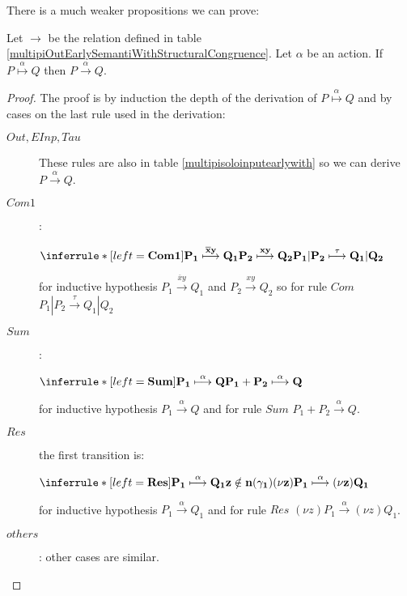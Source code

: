 There is a much weaker propositions we can prove:
\begin{proposition}
  Let $\rightarrow$ be the relation defined in table \ref{multipiOutEarlySemantiWithStructuralCongruence}. Let $\alpha$ be an action. If $P \stackrel{\alpha}{\longmapsto} Q$ then $P\xrightarrow{\alpha} Q$.
  \begin{proof}
    The proof is by induction the depth of the derivation of $P \stackrel{\alpha}{\longmapsto} Q$ and by cases on the last rule used in the derivation:
    \begin{description}
      \item[$Out, EInp, Tau$]
	These rules are also in table \ref{multipisoloinputearlywith} so we can derive $P\xrightarrow{\alpha} Q$. 
      \item[$Com1$]:
	\begin{center}
	  $\inferrule* [left=\bf{Com1}]{
	    P_{1} \stackrel{\overline{x}y}{\longmapsto} Q_{1}
	  \\
	    P_{2} \stackrel{xy}{\longmapsto} Q_{2}
	  }{
	    P_{1}|P_{2} \stackrel{\tau}{\longmapsto} Q_{1}|Q_{2}
	  }$ 
	\end{center}
	for inductive hypothesis $P_{1} \xrightarrow{\overline{x}y} Q_{1}$ and $P_{2} \xrightarrow{xy} Q_{2}$ so for rule $Com$ $P_{1}|P_{2} \xrightarrow{\tau} Q_{1}|Q_{2}$
      \item[$Sum$]:
	\begin{center}
	  $\inferrule* [left=\bf{Sum}]{
	    P_{1} \stackrel{\alpha}{\longmapsto} Q
	  }{
	    P_{1}+P_{2} \stackrel{\alpha}{\longmapsto} Q
	  }$ 
	\end{center}
	for inductive hypothesis $P_{1} \xrightarrow{\alpha} Q$ and for rule $Sum$ $P_{1}+P_{2} \xrightarrow{\alpha} Q$.
      \item[$Res$] the first transition is:
	\begin{center}
	  $\inferrule* [left=\bf{Res}]{
	      P_{1} \stackrel{\alpha}{\longmapsto} Q_{1}
	    \\
	      z\notin n(\gamma_{1})
	  }{
	    (\nu z) P_{1} \stackrel{\alpha}{\longmapsto} (\nu z)Q_{1}
	  }$ 
	\end{center}		
	for inductive hypothesis $P_{1} \xrightarrow{\alpha} Q_{1}$ and for rule $Res$ $(\nu z)P_{1} \xrightarrow{\alpha} (\nu z)Q_{1}$.
      \item[$others$]: other cases are similar.
    \end{description}	    
  \end{proof}
\end{proposition}


